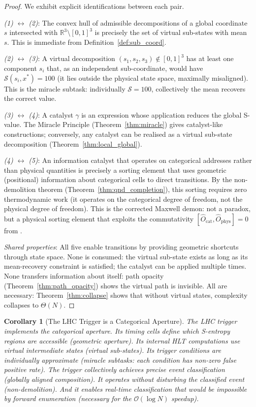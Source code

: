 \documentclass[twocolumn,10pt,a4paper]{article}
\theoremstyle{thmstyle}
\newtheorem{corollary}[theorem]{Corollary}
\theoremstyle{definition}
\theoremstyle{remark}
\newcommand{\R}{\mathbb{R}}
\begin{document}
\begin{proof}
We exhibit explicit identifications between each pair.

\emph{(1) $\leftrightarrow$ (2)}: The convex hull of admissible decompositions
of a global coordinate $s$ intersected with $\R^3 \setminus [0,1]^3$ is
precisely the set of virtual sub-states with mean $s$. This is immediate
from Definition~\ref{def:sub_coord}.

\emph{(2) $\leftrightarrow$ (3)}: A virtual decomposition
$(s_1,s_2,s_3) \notin [0,1]^3$ has at least one component $s_i$ that,
as an independent sub-coordinate, would have $\mathcal{S}(s_i, x^*) = 100$
(it lies outside the physical state space, maximally misaligned). This is
the miracle subtask: individually $\mathcal{S} = 100$, collectively the
mean recovers the correct value.

\emph{(3) $\leftrightarrow$ (4)}: A catalyst $\gamma$ is an expression
whose application reduces the global S-value. The Miracle Principle
(Theorem~\ref{thm:miracle}) gives catalyst-like constructions; conversely,
any catalyst can be realised as a virtual sub-state decomposition
(Theorem~\ref{thm:local_global}).

\emph{(4) $\leftrightarrow$ (5)}: An information catalyst that operates on
categorical addresses rather than physical quantities is precisely a
sorting element that uses geometric (positional) information about
categorical cells to direct transitions. By the non-demolition theorem
(Theorem~\ref{thm:qnd_completion}), this sorting requires zero thermodynamic
work (it operates on the categorical degree of freedom, not the physical
degree of freedom). This is the corrected Maxwell demon: not a paradox,
but a physical sorting element that exploits the commutativity
$[\hat{O}_{\mathrm{cat}}, \hat{O}_{\mathrm{phys}}] = 0$
from \citet{companion:planck}.

\emph{Shared properties}: All five enable transitions by providing geometric
shortcuts through state space. None is consumed: the virtual sub-state
exists as long as its mean-recovery constraint is satisfied; the catalyst
can be applied multiple times. None transfers information about itself:
path opacity (Theorem~\ref{thm:path_opacity}) shows the virtual path is
invisible. All are necessary: Theorem~\ref{thm:collapse} shows that without
virtual states, complexity collapses to $\Theta(N)$.
\end{proof}

\begin{corollary}[The LHC Trigger is a Categorical Aperture]
\label{cor:trigger_aperture}
The LHC trigger implements the categorical aperture. Its timing cells define
which S-entropy regions are accessible (geometric aperture). Its internal
HLT computations use virtual intermediate states (virtual sub-states). Its
trigger conditions are individually approximate (miracle subtasks: each
condition has non-zero false positive rate). The trigger collectively achieves
precise event classification (globally aligned composition). It operates
without disturbing the classified event (non-demolition). And it enables
real-time classification that would be impossible by forward enumeration
(necessary for the $\mathcal{O}(\log N)$ speedup).
\end{corollary}
\end{document}
